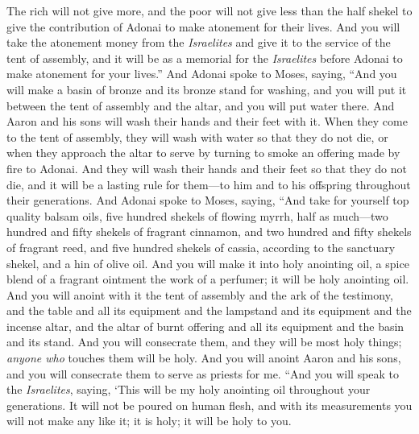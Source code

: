 \begin{biblechapter}
\verse The rich will not give more, and the poor will not give less than the half shekel to give the contribution of Adonai to make atonement for their lives.
\verse And you will take the atonement money from the \textit{Israelites} and give it to the service of the tent of assembly, and it will be as a memorial for the \textit{Israelites} before Adonai to make atonement for your lives.”
 And Adonai spoke to Moses, saying,
\verse “And you will make a basin of bronze and its bronze stand for washing, and you will put it between the tent of assembly and the altar, and you will put water there.
\verse And Aaron and his sons will wash their hands and their feet with it.
\verse When they come to the tent of assembly, they will wash with water so that they do not die, or when they approach the altar to serve by turning to smoke an offering made by fire to Adonai.
\verse And they will wash their hands and their feet so that they do not die, and it will be a lasting rule for them—to him and to his offspring throughout their generations.
 And Adonai spoke to Moses, saying,
\verse “And take for yourself top quality balsam oils, five hundred shekels of flowing myrrh, half as much—two hundred and fifty shekels of fragrant cinnamon, and two hundred and fifty shekels of fragrant reed,
\verse and five hundred shekels of cassia, according to the sanctuary shekel, and a hin of olive oil.
\verse And you will make it into holy anointing oil, a spice blend of a fragrant ointment the work of a perfumer; it will be holy anointing oil.
\verse And you will anoint with it the tent of assembly and the ark of the testimony,
\verse and the table and all its equipment and the lampstand and its equipment and the incense altar,
\verse and the altar of burnt offering and all its equipment and the basin and its stand.
\verse And you will consecrate them, and they will be most holy things; \textit{anyone who} touches them will be holy.
\verse And you will anoint Aaron and his sons, and you will consecrate them to serve as priests for me.
\verse “And you will speak to the \textit{Israelites}, saying, ‘This will be my holy anointing oil throughout your generations.
\verse It will not be poured on human flesh, and with its measurements you will not make any like it; it is holy; it will be holy to you.

\end{biblechapter}
